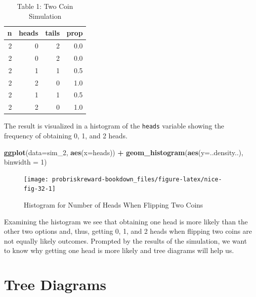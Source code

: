 \documentclass[]{book}
\newenvironment{Shaded}{\begin{snugshade}}{\end{snugshade}}
\newcommand{\KeywordTok}[1]{\textcolor[rgb]{0.13,0.29,0.53}{\textbf{#1}}}
\newcommand{\DataTypeTok}[1]{\textcolor[rgb]{0.13,0.29,0.53}{#1}}
\newcommand{\DecValTok}[1]{\textcolor[rgb]{0.00,0.00,0.81}{#1}}
\newcommand{\StringTok}[1]{\textcolor[rgb]{0.31,0.60,0.02}{#1}}
\newcommand{\OperatorTok}[1]{\textcolor[rgb]{0.81,0.36,0.00}{\textbf{#1}}}
\newcommand{\NormalTok}[1]{#1}
\theoremstyle{definition}
\theoremstyle{definition}
\theoremstyle{definition}
\theoremstyle{remark}
\begin{document}
\begin{table}

\caption{\label{tab:nice-tab-31}Table 1: Two Coin Simulation}
\centering
\begin{tabular}[t]{rrrr}
\toprule
n & heads & tails & prop\\
\midrule
2 & 0 & 2 & 0.0\\
2 & 0 & 2 & 0.0\\
2 & 1 & 1 & 0.5\\
2 & 2 & 0 & 1.0\\
2 & 1 & 1 & 0.5\\
2 & 2 & 0 & 1.0\\
\bottomrule
\end{tabular}
\end{table}

The result is visualized in a histogram of the \texttt{heads} variable
showing the frequency of obtaining 0, 1, and 2 heads.

\begin{Shaded}
\begin{Highlighting}[]
\KeywordTok{ggplot}\NormalTok{(}\DataTypeTok{data=}\NormalTok{sim_}\DecValTok{2}\NormalTok{, }\KeywordTok{aes}\NormalTok{(}\DataTypeTok{x=}\NormalTok{heads)) }\OperatorTok{+}\StringTok{ }\KeywordTok{geom_histogram}\NormalTok{(}\KeywordTok{aes}\NormalTok{(}\DataTypeTok{y=}\NormalTok{..density..), }\DataTypeTok{binwidth =} \DecValTok{1}\NormalTok{)}
\end{Highlighting}
\end{Shaded}

\begin{figure}

{\centering \texttt{[image: probriskreward-bookdown\_files/figure-latex/nice-fig-32-1]} 

}

\caption{Histogram for Number of Heads When Flipping Two Coins}\label{fig:nice-fig-32}
\end{figure}

Examining the histogram we see that obtaining one head is more likely
than the other two options and, thus, getting 0, 1, and 2 heads when
flipping two coins are not equally likely outcomes. Prompted by the
results of the simulation, we want to know why getting one head is more
likely and tree diagrams will help us.

\section{Tree Diagrams}\label{tree_diagrams}
\end{document}
